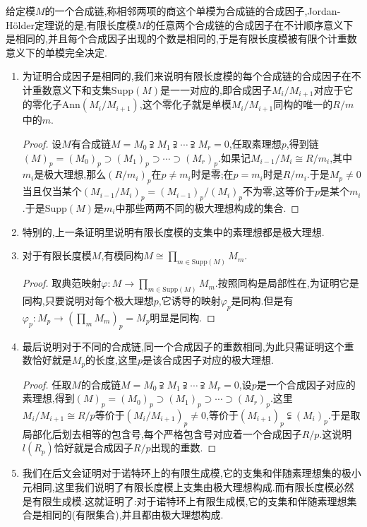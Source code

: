 给定模$M$的一个合成链,称相邻两项的商这个单模为合成链的合成因子,Jordan-H\"older定理说的是,有限长度模$M$的任意两个合成链的合成因子在不计顺序意义下是相同的,并且每个合成因子出现的个数是相同的,于是有限长度模被有限个计重数意义下的单模完全决定.
\begin{enumerate}
	\item 为证明合成因子是相同的,我们来说明有限长度模的每个合成链的合成因子在不计重数意义下和支集$\mathrm{Supp}(M)$是一一对应的,即合成因子$M_i/M_{i+1}$对应于它的零化子$\mathrm{Ann}(M_i/M_{i+1})$,这个零化子就是单模$M_i/M_{i+1}$同构的唯一的$R/m$中的$m$.
	\begin{proof}
		
		设$M$有合成链$M=M_0\supsetneqq M_1\supsetneqq\cdots\supsetneqq M_r=0$,任取素理想$p$,得到链$(M)_p=(M_0)_p\supset(M_1)_p\supset\cdots\supset(M_r)_p$.如果记$M_{i-1}/M_i\cong R/m_i$,其中$m_i$是极大理想,那么$(R/m_i)_p$在$p\not=m_i$时是零;在$p=m_i$时是$R/m_i$.于是$M_p\not=0$当且仅当某个$(M_{i-1}/M_i)_p=(M_{i-1})_p/(M_i)_p$不为零,这等价于$p$是某个$m_i$.于是$\mathrm{Supp}(M)$是$m_i$中那些两两不同的极大理想构成的集合.
	\end{proof}
    \item 特别的,上一条证明里说明有限长度模的支集中的素理想都是极大理想.
    \item 对于有限长度模$M$,有模同构$M\cong\prod_{m\in\mathrm{Supp}(M)}M_m$.
    \begin{proof}
    	
    	取典范映射$\varphi:M\to\prod_{m\in\mathrm{Supp}(M)}M_m$.按照同构是局部性在,为证明它是同构,只要说明对每个极大理想$p$,它诱导的映射$\varphi_p$是同构.但是有$\varphi_p:M_p\to(\prod_mM_m)_p=M_p$明显是同构.
    \end{proof}
    \item 最后说明对于不同的合成链,同一个合成因子的重数相同,为此只需证明这个重数恰好就是$M_p$的长度,这里$p$是该合成因子对应的极大理想.
    \begin{proof}
    	
    	任取$M$的合成链$M=M_0\supsetneqq M_1\supsetneqq\cdots\supsetneqq M_r=0$,设$p$是一个合成因子对应的素理想,得到$(M)_p=(M_0)_p\supset(M_1)_p\supset\cdots\supset(M_r)_p$.这里$M_i/M_{i+1}\cong R/p$等价于$(M_i/M_{i+1})_p\not=0$,等价于$(M_{i+1})_p\subsetneqq(M_i)_p$.于是取局部化后划去相等的包含号,每个严格包含号对应着一个合成因子$R/p$.这说明$l(R_p)$恰好就是合成因子$R/p$出现的重数.
    \end{proof}
    \item 我们在后文会证明对于诺特环上的有限生成模,它的支集和伴随素理想集的极小元相同,这里我们说明了有限长度模上支集由极大理想构成.而有限长度模必然是有限生成模.这就证明了:对于诺特环上有限生成模,它的支集和伴随素理想集合是相同的(有限集合),并且都由极大理想构成.
\end{enumerate}
